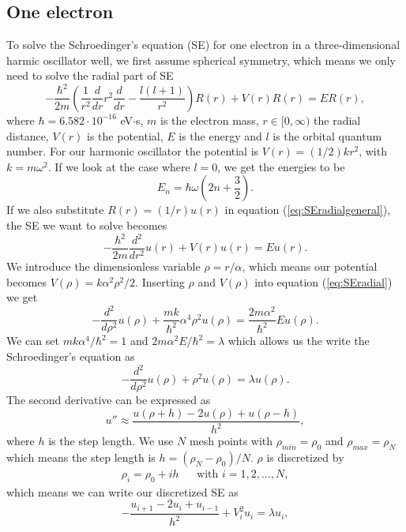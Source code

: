 \documentclass[norsk,a4paper,12pt]{article}
\begin{document}
\subsection{One electron}
To solve the Schroedinger's equation (SE) for one electron in a three-dimensional harmic oscillator well, we first assume spherical symmetry, which means we only need to solve the radial part of SE
\begin{equation}
-\frac{\hbar ^2}{2m}\left(\frac{1}{r^2}\frac{d}{dr}r^2\frac{d}{dr} - \frac{l(l+1)}{r^2}\right)R(r) + V(r)R(r) = ER(r),
\label{eq:SEradialgeneral}
\end{equation}
where $\hbar = 6.582 \cdot 10^{-16}$ eV$\cdot$s, $m$ is the electron mass, $r \in [0,\infty)$ the radial distance, $V(r)$ is the potential, $E$ is the energy and $l$ is the orbital quantum number. For our harmonic oscillator the potential is $V(r) = (1/2)kr^2$, with $k=m\omega ^2$. If we look at the case where $l=0$, we get the energies to be $$E_n = \hbar \omega \left(2n + \frac{3}{2}\right).$$ If we also substitute $R(r) = (1/r)u(r)$ in equation (\ref{eq:SEradialgeneral}), the SE we want to solve becomes 
\begin{equation}
-\frac{\hbar ^2}{2m}\frac{d^2}{dr^2} u(r) + V(r) u(r) = Eu(r).
\label{eq:SEradial}
\end{equation}
We introduce the dimensionless variable $\rho = r/\alpha$, which means our potential becomes $V(\rho)= k\alpha ^2 \rho ^2 / 2$. Inserting $\rho$ and $V(\rho)$ into equation (\ref{eq:SEradial}) we get
$$-\frac{d^2}{d\rho ^2}u(\rho) + \frac{mk}{\hbar ^2}\alpha ^4 \rho^2 u(\rho) = \frac{2m\alpha ^2}{\hbar^2}Eu(\rho).$$
We can set $mk\alpha^4/\hbar^2 = 1$ and $2m\alpha^2E/\hbar^2 = \lambda$ which allows us the write the Schroedinger's equation as \begin{equation}
-\frac{d^2}{d\rho ^2}u(\rho) + \rho ^2 u(\rho) = \lambda u(\rho).
\label{eq:SEdimless}
\end{equation}
The second derivative can be expressed as $$u'' \approx \frac{u(\rho + h) - 2u(\rho) + u(\rho -h)}{h^2},$$ where $h$ is the step length. We use $N$ mesh points with $\rho_{min} = \rho_0$ and $\rho_{max} = \rho_N$ which means the step length is $h = (\rho_N - \rho_0)/N$. $\rho$ is discretized by 
\begin{align*}
\rho_i  = \rho _0 + ih && \text{with }i = 1,2,...,N,
\end{align*}
which means we can write our discretized SE as 
\begin{equation}
-\frac{u_{i+1}-2u_i + u_{i-1}}{h^2} + V_i^2u_i = \lambda u_i,
\label{eq:SEdiscretized}
\end{equation}
\end{document}
